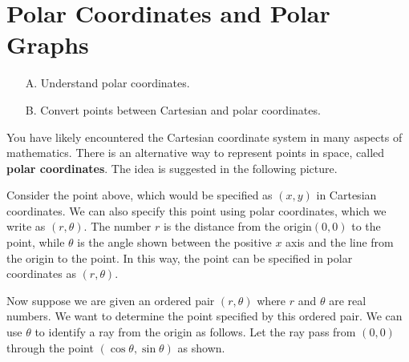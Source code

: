 \section{Polar Coordinates and Polar Graphs}

\begin{outcome}
\begin{enumerate}
\item[A.]  Understand polar coordinates.

\item[B.]  Convert points between Cartesian and polar coordinates. 
\end{enumerate}
\end{outcome}

You have likely encountered the Cartesian coordinate system in many aspects of mathematics. There is an alternative way to represent points in space, called \textbf{polar
coordinates}. The idea is suggested in the following picture.

\begin{center}
\end{center}

Consider the point above, which would be specified as $(x,y)$ in Cartesian coordinates. We can also specify this point using polar coordinates, which we write as $\left( r, \theta \right)$. The number $r$ is the distance from the origin$\left( 0,0\right)$ to the point, while $\theta $ is the angle shown
between the positive $x$ axis and the line from the origin to the point. In this way, the point can be specified in polar coordinates as $\left(r, \theta \right)$.

Now suppose we are given an ordered pair $\left( r,\theta \right) $ where 
$r$ and $\theta$ are real numbers. We want to determine the point specified by this ordered pair. We can use $\theta $ to identify a ray
from the origin as follows. Let the ray pass from $\left( 0,0\right) $
through the point $\left( \cos \theta ,\sin \theta \right) $ as shown.

\begin{center}
\end{center}

